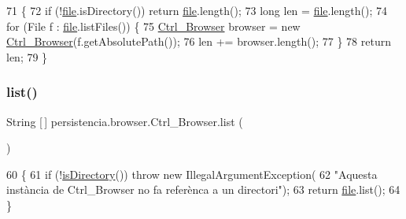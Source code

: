 \begin{DoxyCode}
71                          \{
72         \textcolor{keywordflow}{if} (!\hyperlink{classpersistencia_1_1browser_1_1Ctrl__Browser_a72c151aed575c0848f7dbb1609b373c8}{file}.isDirectory()) \textcolor{keywordflow}{return} \hyperlink{classpersistencia_1_1browser_1_1Ctrl__Browser_a72c151aed575c0848f7dbb1609b373c8}{file}.length();
73         \textcolor{keywordtype}{long} len = \hyperlink{classpersistencia_1_1browser_1_1Ctrl__Browser_a72c151aed575c0848f7dbb1609b373c8}{file}.length();
74         \textcolor{keywordflow}{for} (File f : \hyperlink{classpersistencia_1_1browser_1_1Ctrl__Browser_a72c151aed575c0848f7dbb1609b373c8}{file}.listFiles()) \{
75             \hyperlink{classpersistencia_1_1browser_1_1Ctrl__Browser_a6cd8687a9748fc4c169d1d72be7081b1}{Ctrl\_Browser} browser = \textcolor{keyword}{new} \hyperlink{classpersistencia_1_1browser_1_1Ctrl__Browser_a6cd8687a9748fc4c169d1d72be7081b1}{Ctrl\_Browser}(f.getAbsolutePath());
76             len += browser.length();
77         \}
78         \textcolor{keywordflow}{return} len;
79     \}
\end{DoxyCode}
\mbox{\label{classpersistencia_1_1browser_1_1Ctrl__Browser_abbf52c645a931fb8e5f727c2c99af97a}} 
\subsubsection{\texorpdfstring{list()}{list()}}
{\footnotesize\ttfamily String \mbox{[}$\,$\mbox{]} persistencia.\+browser.\+Ctrl\+\_\+\+Browser.\+list (\begin{DoxyParamCaption}{ }\end{DoxyParamCaption})\hspace{0.3cm}{\ttfamily [inline]}}


\begin{DoxyCode}
60                            \{
61         \textcolor{keywordflow}{if} (!\hyperlink{classpersistencia_1_1browser_1_1Ctrl__Browser_abdf13ea9a8d928b1efc6f3a69e18f6c6}{isDirectory}()) \textcolor{keywordflow}{throw} \textcolor{keyword}{new} IllegalArgumentException(
62             \textcolor{stringliteral}{"Aquesta instància de Ctrl\_Browser no fa referènca a un directori"});
63         \textcolor{keywordflow}{return} \hyperlink{classpersistencia_1_1browser_1_1Ctrl__Browser_a72c151aed575c0848f7dbb1609b373c8}{file}.list();
64     \}
\end{DoxyCode}
\mbox{\label{classpersistencia_1_1browser_1_1Ctrl__Browser_a947773ee38a780bae338aa0e4f396f6f}} 
